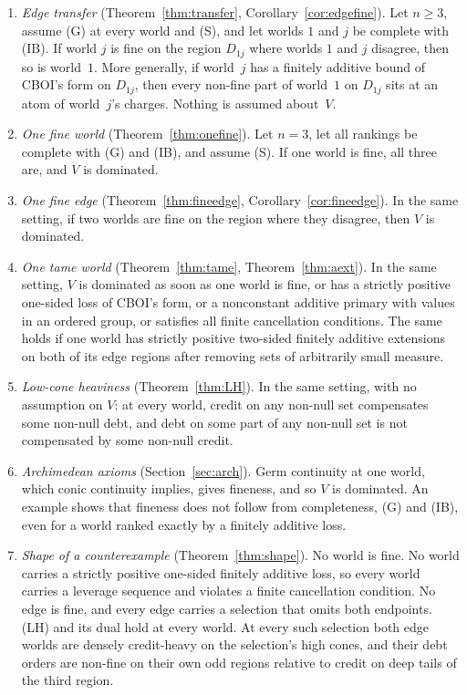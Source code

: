 \documentclass[11pt]{article}
\theoremstyle{definition}\newtheorem{definition}[theorem]{Definition}
\theoremstyle{remark}\newtheorem{remark}[theorem]{Remark}
\begin{document}
\begin{enumerate}[leftmargin=*,itemsep=3pt]
\item \emph{Edge transfer} (Theorem~\ref{thm:transfer},
Corollary~\ref{cor:edgefine}). Let $n\ge3$, assume (G) at every world and
(S), and let worlds $1$ and $j$ be complete with (IB). If world $j$ is fine
on the region $D_{1j}$ where worlds $1$ and $j$ disagree, then so is
world~$1$. More generally, if world~$j$ has a finitely additive bound of
CBOI's form on $D_{1j}$, then every non-fine part of world~$1$ on $D_{1j}$
sits at an atom of world~$j$'s charges. Nothing is assumed about~$V$.
\item \emph{One fine world} (Theorem~\ref{thm:onefine}). Let $n=3$, let all
rankings be complete with (G) and (IB), and assume (S). If one world is fine,
all three are, and $V$ is dominated.
\item \emph{One fine edge} (Theorem~\ref{thm:fineedge},
Corollary~\ref{cor:fineedge}). In the same setting, if two worlds are fine
on the region where they disagree, then $V$ is dominated.
\item \emph{One tame world} (Theorem~\ref{thm:tame},
Theorem~\ref{thm:aext}). In the same setting, $V$ is dominated as soon as
one world is fine, or has a strictly positive one-sided loss of CBOI's form,
or a nonconstant additive primary with values in an ordered group, or
satisfies all finite cancellation conditions. The same holds if one
world has strictly positive two-sided finitely additive extensions on both of
its edge regions after removing sets of arbitrarily small measure.
\item \emph{Low-cone heaviness} (Theorem~\ref{thm:LH}). In the same
setting, with no assumption on $V$: at every world, credit on any non-null
set compensates some non-null debt, and debt on some part of any non-null set
is not compensated by some non-null credit.
\item \emph{Archimedean axioms} (Section~\ref{sec:arch}). Germ continuity at
one world, which conic continuity implies, gives fineness, and so $V$ is
dominated. An example shows that fineness does not follow from completeness,
(G) and (IB), even for a world ranked exactly by a finitely additive loss.
\item \emph{Shape of a counterexample} (Theorem~\ref{thm:shape}). No world
is fine. No world carries a strictly positive one-sided finitely additive
loss, so every world carries a leverage sequence and violates a finite
cancellation condition. No edge is fine, and every edge carries a selection
that omits both endpoints. (LH) and its dual hold at every world. At every
such selection both edge worlds are densely credit-heavy on the selection's
high cones, and their debt orders are non-fine on their own odd regions
relative to credit on deep tails of the third region.
\end{enumerate}
\end{document}
